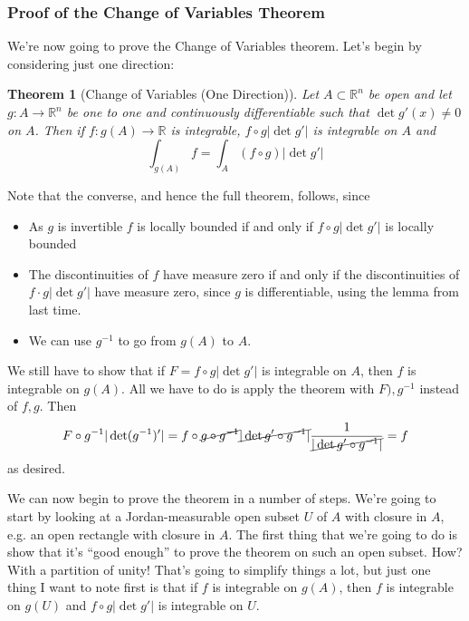 \documentclass{article}
\newtheorem{theorem}{Theorem}
\newcommand{\reals}[0]{\mathbb{R}}
\begin{document}
\subsubsection{Proof of the Change of Variables Theorem}

We're now going to prove the Change of Variables theorem. Let's begin by considering just one direction:
\begin{theorem}[Change of Variables (One Direction)]
  Let \(A \subset \reals^n\) be open and let \(g: A \to \reals^n\) be one to one and continuously differentiable such that \(\det g'(x) \neq 0\) on \(A\). Then if \(f: g(A) \to \reals\) is integrable, \(f \circ g|\det g'|\) is integrable on \(A\) and
  \begin{equation}
    \int_{g(A)}f = \int_A(f \circ g)|\det g'|
  \end{equation}
  \label{changeofvar1d}
\end{theorem}
Note that the converse, and hence the full theorem, follows, since
\begin{itemize}
  \item As \(g\) is invertible \(f\) is locally bounded if and only if \(f \circ g|\det g'|\) is locally bounded
  \item The discontinuities of \(f\) have measure zero if and only if the discontinuities of \(f \cdot g|\det g'|\) have measure zero, since \(g\) is differentiable, using the lemma from last time.
  \item We can use \(g^{-1}\) to go from \(g(A)\) to \(A\).
\end{itemize}
We still have to show that if \(F = f \circ g|\det g'|\) is integrable on \(A\), then \(f\) is integrable on \(g(A)\). All we have to do is apply the theorem with \(F), g^{-1}\) instead of \(f, g\). Then
\begin{equation}
  F \circ g^{-1}|\det(g^{-1})'| = f \circ \cancel{g \circ g^{-1}} \cancel{|\det g' \circ g^{-1}|}\frac{1}{\cancel{|\det g' \circ g^{-1}|}} = f
\end{equation}
as desired.

We can now begin to prove the theorem in a number of steps. We're going to start by looking at a Jordan-measurable open subset \(U\) of \(A\) with closure in \(A\), e.g. an open rectangle with closure in \(A\). The first thing that we're going to do is show that it's ``good enough'' to prove the theorem on such an open subset. How? With a partition of unity! That's going to simplify things a lot, but just one thing I want to note first is that if \(f\) is integrable on \(g(A)\), then \(f\) is integrable on \(g(U)\) and \(f \circ g|\det g'|\) is integrable on \(U\).
\end{document}
